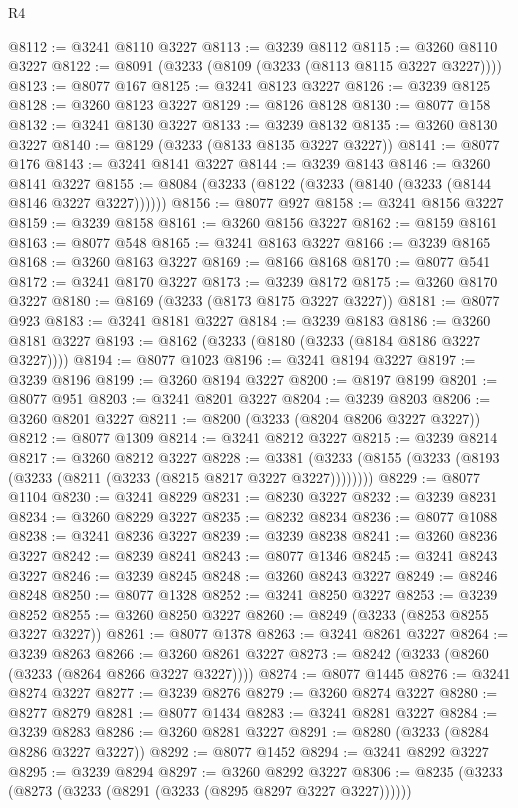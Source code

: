 \begin{lexlean}{R4}
\begin{coremodule}
@8112 := @3241 @8110 @3227
@8113 := @3239 @8112
@8115 := @3260 @8110 @3227
@8122 := @8091 (@3233 (@8109 (@3233 (@8113 @8115 @3227 @3227))))
@8123 := @8077 @167
@8125 := @3241 @8123 @3227
@8126 := @3239 @8125
@8128 := @3260 @8123 @3227
@8129 := @8126 @8128
@8130 := @8077 @158
@8132 := @3241 @8130 @3227
@8133 := @3239 @8132
@8135 := @3260 @8130 @3227
@8140 := @8129 (@3233 (@8133 @8135 @3227 @3227))
@8141 := @8077 @176
@8143 := @3241 @8141 @3227
@8144 := @3239 @8143
@8146 := @3260 @8141 @3227
@8155 := @8084 (@3233 (@8122 (@3233 (@8140 (@3233 (@8144 @8146 @3227 @3227))))))
@8156 := @8077 @927
@8158 := @3241 @8156 @3227
@8159 := @3239 @8158
@8161 := @3260 @8156 @3227
@8162 := @8159 @8161
@8163 := @8077 @548
@8165 := @3241 @8163 @3227
@8166 := @3239 @8165
@8168 := @3260 @8163 @3227
@8169 := @8166 @8168
@8170 := @8077 @541
@8172 := @3241 @8170 @3227
@8173 := @3239 @8172
@8175 := @3260 @8170 @3227
@8180 := @8169 (@3233 (@8173 @8175 @3227 @3227))
@8181 := @8077 @923
@8183 := @3241 @8181 @3227
@8184 := @3239 @8183
@8186 := @3260 @8181 @3227
@8193 := @8162 (@3233 (@8180 (@3233 (@8184 @8186 @3227 @3227))))
@8194 := @8077 @1023
@8196 := @3241 @8194 @3227
@8197 := @3239 @8196
@8199 := @3260 @8194 @3227
@8200 := @8197 @8199
@8201 := @8077 @951
@8203 := @3241 @8201 @3227
@8204 := @3239 @8203
@8206 := @3260 @8201 @3227
@8211 := @8200 (@3233 (@8204 @8206 @3227 @3227))
@8212 := @8077 @1309
@8214 := @3241 @8212 @3227
@8215 := @3239 @8214
@8217 := @3260 @8212 @3227
@8228 := @3381 (@3233 (@8155 (@3233 (@8193 (@3233 (@8211 (@3233 (@8215 @8217 @3227 @3227))))))))
@8229 := @8077 @1104
@8230 := @3241 @8229
@8231 := @8230 @3227
@8232 := @3239 @8231
@8234 := @3260 @8229 @3227
@8235 := @8232 @8234
@8236 := @8077 @1088
@8238 := @3241 @8236 @3227
@8239 := @3239 @8238
@8241 := @3260 @8236 @3227
@8242 := @8239 @8241
@8243 := @8077 @1346
@8245 := @3241 @8243 @3227
@8246 := @3239 @8245
@8248 := @3260 @8243 @3227
@8249 := @8246 @8248
@8250 := @8077 @1328
@8252 := @3241 @8250 @3227
@8253 := @3239 @8252
@8255 := @3260 @8250 @3227
@8260 := @8249 (@3233 (@8253 @8255 @3227 @3227))
@8261 := @8077 @1378
@8263 := @3241 @8261 @3227
@8264 := @3239 @8263
@8266 := @3260 @8261 @3227
@8273 := @8242 (@3233 (@8260 (@3233 (@8264 @8266 @3227 @3227))))
@8274 := @8077 @1445
@8276 := @3241 @8274 @3227
@8277 := @3239 @8276
@8279 := @3260 @8274 @3227
@8280 := @8277 @8279
@8281 := @8077 @1434
@8283 := @3241 @8281 @3227
@8284 := @3239 @8283
@8286 := @3260 @8281 @3227
@8291 := @8280 (@3233 (@8284 @8286 @3227 @3227))
@8292 := @8077 @1452
@8294 := @3241 @8292 @3227
@8295 := @3239 @8294
@8297 := @3260 @8292 @3227
@8306 := @8235 (@3233 (@8273 (@3233 (@8291 (@3233 (@8295 @8297 @3227 @3227))))))

\end{coremodule}
\end{lexlean}
